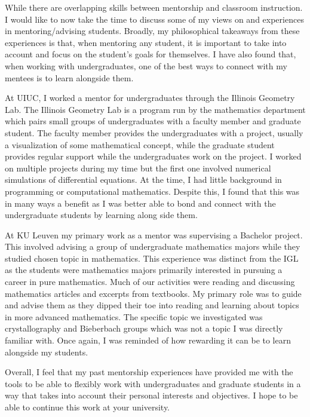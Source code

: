 \documentclass{article}
\begin{document}
While there are overlapping skills between mentorship and classroom instruction. I would like to now take the time to discuss some of my views on and experiences in mentoring/advising students. Broadly, my philosophical takeaways from these experiences is that, when mentoring any student, it is important to take into account and focus on the student's goals for themselves. I have also found that, when working with undergraduates, one of the best ways to connect with my mentees is to learn alongside them.

At UIUC, I worked a mentor for undergraduates through the Illinois Geometry Lab. The Illinois Geometry Lab is a program run by the mathematics department which pairs small groups of undergraduates with a faculty member and graduate student. The faculty member provides the undergraduates with a project, usually a visualization of some mathematical concept, while the graduate student provides regular support while the undergraduates work on the project. I worked on multiple projects during my time but the first one involved numerical simulations of differential equations. At the time, I had little background in programming or computational mathematics. Despite this, I found that this was in many ways a benefit as I was better able to bond and connect with the undergraduate students by learning along side them. 

At KU Leuven my primary work as a mentor was supervising a Bachelor project. This involved advising a group of undergraduate mathematics majors while they studied chosen topic in mathematics. This experience was distinct from the IGL as the students were mathematics majors primarily interested in pursuing a career in pure mathematics. Much of our activities were reading and discussing mathematics articles and excerpts from textbooks. My primary role was to guide and advise them as they dipped their toe into reading and learning about topics in more advanced mathematics. The specific topic we investigated was crystallography and Bieberbach groups which was not a topic I was directly familiar with. Once again, I was reminded of how rewarding it can be to learn alongside my students.

Overall, I feel that my past mentorship experiences have provided me with the tools to be able to flexibly work with undergraduates and graduate students in a way that takes into account their personal interests and objectives. I hope to be able  to continue this work at your university.
\end{document}
